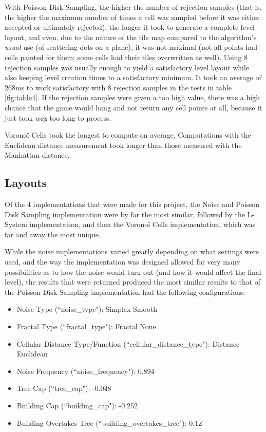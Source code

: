With Poisson Disk Sampling, the higher the number of rejection samples (that is, the higher the maximum number of times a cell was sampled before it was either accepted or ultimately rejected), the longer it took to generate a complete level layout, and even, due to the nature of the tile map compared to the algorithm's \textit{usual} use (of scattering dots on a plane), it was not maximal (not all points had cells painted for them; some cells had their tiles overwritten as well). Using 8 rejection samples was usually enough to yield a satisfactory level layout while also keeping level creation times to a satisfactory minimum. It took an average of 268ms to work satisfactory with 8 rejection samples in the tests in table \ref{fig:table4}. If the rejection samples were given a too high value, there was a high  chance that the game would hang and not return any cell points at all, because it just took \textit{way} too long to process.

Voronoï Cells took the longest to compute on average. Computations with the Euclidean distance measurement took longer than those measured with the Manhattan distance.

\subsection{Layouts}

Of the 4 implementations that were made for this project, the Noise and Poisson Disk Sampling implementation were by far the most similar, followed by the L-System implementation, and then the Voronoï Cells implementation, which was far and away the most unique.

While the noise implementations varied greatly depending on what settings were used, and the way the implementation was designed allowed for very many possibilities as to how the noise would turn out (and how it would affect the final level), the results that were returned produced the most similar results to that of the Poisson Disk Sampling implementation had the following configurations:

\begin{itemize} \label{noisedefaults}
    \item Noise Type (``noise\_type"): Simplex Smooth
    \item Fractal Type (``fractal\_type"): Fractal None
    \item Cellular Distance Type/Function (``cellular\_distance\_type"): Distance Euclidean
    \item Noise Frequency (``noise\_frequency"): 0.894
    \item Tree Cap (``tree\_cap"): -0.048
    \item Building Cap (``building\_cap"): -0.252
    \item Building Overtakes Tree (``building\_overtakes\_tree"): 0.12
\end{itemize}

